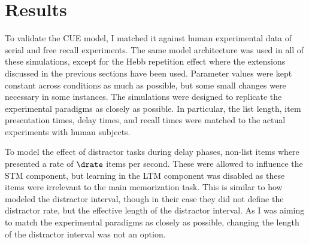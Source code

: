 \chapter{Results}
To validate the CUE model, I matched it against human experimental data of serial and free recall experiments.
The same model architecture was used in all of these simulations, except for the Hebb repetition effect where the extensions discussed in the previous sections have been used.
Parameter values were kept constant across conditions as much as possible, but some small changes were necessary in some instances.
The simulations were designed to replicate the experimental paradigms as closely as possible.
In particular, the list length, item presentation times, delay times, and recall times were matched to the actual experiments with human subjects.

To model the effect of distractor tasks during delay phases, non-list items where presented a rate of $\drate$ items per second.
These were allowed to influence the STM component, but learning in the LTM component was disabled as these items were irrelevant to the main memorization task.
This is similar to how \textcite{Howard2002} modeled the distractor interval, though in their case they did not define the distractor rate, but the effective length of the distractor interval.
As I was aiming to match the experimental paradigms as closely as possible, changing the length of the distractor interval was not an option.


